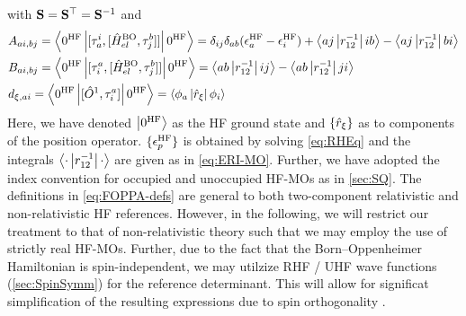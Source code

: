 with $\mathbf{S} = \mathbf{S}^\top = \mathbf{S}^{-1}$ and
\begin{subequations}
  \label{eq:FOPPA-defs}
\begin{align}
  &A_{ai,bj} = \left\langle 0^{\mathrm{HF}} \left\vert [\tau^i_a,[\hat{H}^{\mathrm{BO}}_{el}, \tau_j^b]] \right\vert 0^{\mathrm{HF}} \right\rangle = 
    \delta_{ij}\delta_{ab}(\epsilon^{\mathrm{HF}}_a - \epsilon^{\mathrm{HF}}_i) + \left\langle aj \left\vert r_{12}^{-1} \right\vert ib \right\rangle - \left\langle aj \left\vert r_{12}^{-1} \right\vert bi \right\rangle \\
  &B_{ai,bj} = \left\langle 0^{\mathrm{HF}} \left\vert [\tau^a_i,[\hat{H}^{\mathrm{BO}}_{el}, \tau_j^b]] \right\vert 0^{\mathrm{HF}} \right\rangle = 
    \left\langle ab \left\vert r_{12}^{-1} \right\vert ij \right\rangle - \left\langle ab \left\vert r_{12}^{-1} \right\vert ji \right\rangle \\
  &d_{\xi,ai} = \left\langle 0^{\mathrm{HF}} \left\vert [\hat{O}^1,\tau^{a}_i] \right\vert 0^{\mathrm{HF}} \right\rangle = \left\langle \phi_a \left\vert \hat{r}_\xi  \right\vert \phi_i \right\rangle
\end{align}
\end{subequations}
Here, we have denoted $\left\vert 0^{\mathrm{HF}} \right\rangle$ as the HF ground state and $\{\hat{r}_\xi\}$ as to components of the position
operator. $\{\epsilon^{\mathrm{HF}}_p\}$ is obtained by solving \cref{eq:RHEq} and the integrals $\left\langle \cdot \left\vert r^{-1}_{12} \right\vert \cdot \right\rangle$
are given as in \cref{eq:ERI-MO}. Further, we have adopted the index convention for occupied and unoccupied HF-MOs
as in \cref{sec:SQ}. The definitions in \cref{eq:FOPPA-defs} are general to both two-component relativistic and 
non-relativistic HF references. However, in the following, we will restrict our treatment to that of non-relativistic theory
such that we may employ the use of strictly real HF-MOs. Further, due to the fact that the Born--Oppenheimer Hamiltonian
is spin-independent, we may utilzize RHF / UHF wave functions (\cref{sec:SpinSymm}) for the reference determinant. 
This will allow for significat simplification of the resulting expressions due to spin orthogonality \cite{Yeager84_33}.


